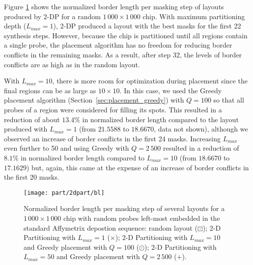Figure \ref{fig:2dpart_bl} shows the normalized border length per masking step
of layouts produced by 2-DP for a random $1\,000\times 1\,000$ chip. With maximum
partitioning depth ($L_{max}=1$), 2-DP produced a layout with the best masks for
the first 22 synthesis steps. However, because the chip is partitioned until all
regions contain a single probe, the placement algorithm has no freedom for
reducing border conflicts in the remaining masks. As a result, after step 32,
the levels of border conflicts are as high as in the random layout.

With $L_{max}=10$, there is more room for optimization during placement since
the final regions can be as large as $10\times 10$. In this case, we used the
Greedy placement algorithm (Section~\ref{sec:placement_greedy}) with $Q=100$ so
that all probes of a region were considered for filling its spots. This resulted
in a reduction of about $13.4\%$ in normalized border length compared to the
layout produced with $L_{max}=1$ (from $21.5588$ to $18.6670$, data not shown),
although we observed an increase of border conflicts in the first 24 masks.
Increasing $L_{max}$ even further to 50 and using Greedy with $Q=2\,500$
resulted in a reduction of $8.1\%$ in normalized border length compared to
$L_{max}=10$ (from $18.6670$ to $17.1629$) but, again, this came at the expense
of an increase of border conflicts in the first 20 masks.

\begin{figure}[t]\centering
\texttt{[image: part/2dpart/bl]}
\caption{\label{fig:2dpart_bl}
  Normalized border length per masking step of several layouts for a
  $1\,000\times 1\,000$ chip with random probes left-most embedded in the
  standard Affymetrix depostion sequence: random layout ({\tiny $\boxdot$}); 2-D
  Partitioning with $L_{max}=1$ ({\scriptsize $\times$}); 2-D Partitioning with
  $L_{max}=10$ and Greedy placement with $Q=100$ ({\tiny $\odot$}); 2-D
  Partitioning with $L_{max}=50$ and Greedy placement with $Q=2\,500$
  ({\tiny $+$}).}
\end{figure}

